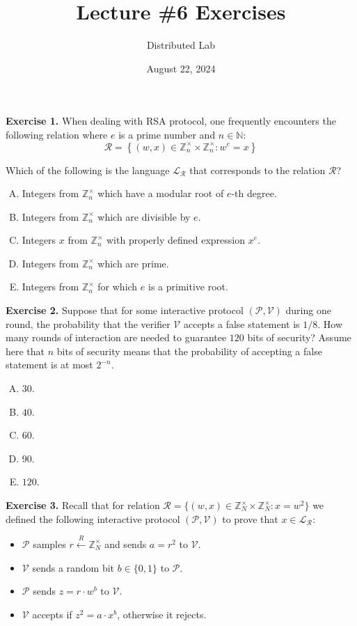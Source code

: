 \documentclass{zkdl-tests-template}
\title{\huge\sffamily\bfseries Lecture \#6 Exercises}
\author{\Large\sffamily Distributed Lab}
\date{\sffamily August 22, 2024}
\begin{document}
\pagestyle{fancy}

\maketitle

\textbf{Exercise 1.} When dealing with RSA protocol, one frequently encounters the following relation where $e$ is a prime number and $n \in \mathbb{N}$:
\begin{equation*}
    \mathcal{R} = \left\{ (w, x) \in \mathbb{Z}_n^{\times} \times \mathbb{Z}_n^{\times}: w^e = x \right\}
\end{equation*}

Which of the following is the language $\mathcal{L}_{\mathcal{R}}$ that corresponds to the relation $\mathcal{R}$?
\begin{enumerate}[(A)]
    \item Integers from $\mathbb{Z}_n^{\times}$ which have a modular root of $e$-th degree.
    \item Integers from $\mathbb{Z}_n^{\times}$ which are divisible by $e$.
    \item Integers $x$ from $\mathbb{Z}_n^{\times}$ with properly defined expression $x^e$.
    \item Integers from $\mathbb{Z}_n^{\times}$ which are prime.
    \item Integers from $\mathbb{Z}_n^{\times}$ for which $e$ is a primitive root.
\end{enumerate}

\textbf{Exercise 2.} Suppose that for some interactive protocol $(\mathcal{P}, \mathcal{V})$ during one round, the probability that the verifier $\mathcal{V}$ accepts a false statement is $1/8$. How many rounds of interaction are needed to guarantee $120$ bits of security? Assume here that $n$ bits of security means that the probability of accepting a false statement is at most $2^{-n}$.
\begin{enumerate}[(A)]
    \item $30$.
    \item $40$.
    \item $60$.
    \item $90$.
    \item $120$.
\end{enumerate}

\pagebreak
\textbf{Exercise 3.} Recall that for relation $\mathcal{R} = \{(w,x) \in \mathbb{Z}_N^{\times} \times \mathbb{Z}_N^{\times}: x = w^2\}$ we defined the following interactive protocol $(\mathcal{P}, \mathcal{V})$ to prove that $x \in \mathcal{L}_{\mathcal{R}}$:
\begin{itemize}
    \item $\mathcal{P}$ samples $r \xleftarrow{R} \mathbb{Z}_N^{\times}$ and sends $a = r^2$ to $\mathcal{V}$.
    \item $\mathcal{V}$ sends a random bit $b \in \{0,1\}$ to $\mathcal{P}$.
    \item $\mathcal{P}$ sends $z = r \cdot w^b$ to $\mathcal{V}$.
    \item $\mathcal{V}$ accepts if $z^2 = a \cdot x^b$, otherwise it rejects.
\end{itemize}
\end{document}
